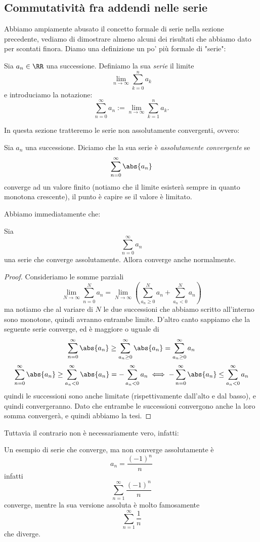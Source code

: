 \documentclass[11pt]{scrartcl}
\begin{document}
  \subsection{Commutatività fra addendi nelle serie}
  Abbiamo ampiamente abusato il concetto formale di serie nella sezione precedente, vediamo di dimostrare almeno alcuni dei risultati che abbiamo dato per scontati finora. Diamo una definizione un po' più formale di "serie":
  \begin{definition}[Serie]
  	Sia $a_n\in\RR$ una successione. Definiamo la sua \textit{serie} il limite
  	$$\lim_{n\to\infty}\sum_{k=0}^{n}a_k$$
  	e introduciamo la notazione:
  	$$\sum_{n=0}^\infty a_n:=\lim_{n\to\infty}\sum_{k=1}^{n}a_k.$$
  \end{definition}
  In questa sezione tratteremo le serie non assolutamente convergenti, ovvero:
  \begin{definition}
  	Sia $a_n$ una successione. Diciamo che la sua serie è \textit{assolutamente convergente} se
  	$$\sum_{n=0}^{\infty}\abs{a_n}$$
  	converge ad un valore finito (notiamo che il limite esisterà sempre in quanto monotona crescente), il punto è capire se il valore è limitato.
  \end{definition}
  Abbiamo immediatamente che:
  \begin{lemma}
  	Sia 
  	$$\sum_{n=0}^\infty a_n$$
  	una serie che converge assolutamente. Allora converge anche normalmente.
  \end{lemma}
  \begin{proof}
  	Consideriamo le somme parziali 
  	$$\lim_{N\to\infty}\sum_{n=0}^{N}a_n=\lim_{N\to\infty}\left(\sum_{a_n\ge 0}^{N}a_n+\sum_{a_n<0}^{N}a_n\right)$$
  	ma notiamo che al variare di $N$ le due successioni che abbiamo scritto all'interno sono monotone, quindi avranno entrambe limite. D'altro canto sappiamo che la seguente serie converge, ed è maggiore o uguale di 
  	$$\sum_{n=0}^{\infty}\abs{a_n} \ge \sum_{a_n\ge 0}^{\infty}\abs{a_n}=\sum_{a_n\ge 0}^{\infty}a_n$$
  	$$\sum_{n=0}^{\infty}\abs{a_n} \ge \sum_{a_n <  0}^{\infty}\abs{a_n}=-\sum_{a_n<0}^{\infty}a_n \iff -\sum_{n=0}^{\infty}\abs{a_n}\le \sum_{a_n<0}^{\infty}a_n$$
  	quindi le successioni sono anche limitate (rispettivamente dall'alto e dal basso), e quindi convergeranno. Dato che entrambe le successioni convergono anche la loro somma convergerà, e quindi abbiamo la tesi.
  \end{proof}
  Tuttavia il contrario non è necessariamente vero, infatti:
  \begin{example}
  	Un esempio di serie che converge, ma non converge assolutamente è
  	$$a_n=\frac{(-1)^n}{n}$$
  	infatti 
  	$$\sum_{n=1}^{\infty}\frac{(-1)^n}{n}$$
  	converge, mentre la sua versione assoluta è molto famosamente
  	$$\sum_{n=1}^{\infty}\frac{1}{n}$$
  	che diverge.
  \end{example}
\end{document}

